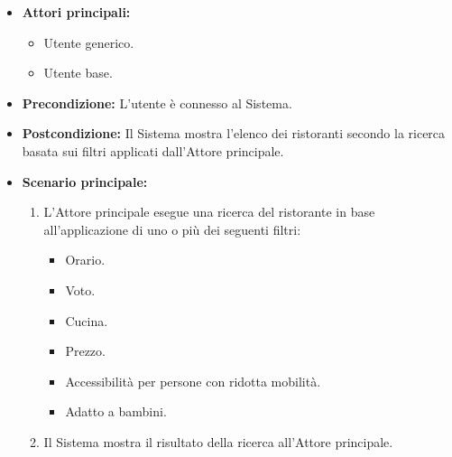 \label{usecase:Ricerca ristoranti per filtri}
\begin{itemize}
	\item \textbf{Attori principali:} 
	\begin{itemize}
		\item Utente generico.
		\item Utente base.
	\end{itemize}

	\item \textbf{Precondizione:} L'utente è connesso al Sistema.

	\item \textbf{Postcondizione:} Il Sistema mostra l'elenco dei ristoranti secondo la ricerca basata sui filtri applicati dall'Attore principale.

	\item \textbf{Scenario principale:}
	      \begin{enumerate}
		      \item L'Attore principale esegue una ricerca del ristorante in base all'applicazione di uno o più dei seguenti filtri:
		            \begin{itemize}
			            \item Orario.
			            \item Voto.
			            \item Cucina.
			            \item Prezzo.
			            \item Accessibilità per persone con ridotta mobilità.
			            \item Adatto a bambini.
		            \end{itemize}
		      \item Il Sistema mostra il risultato della ricerca all'Attore principale.
	      \end{enumerate}
\end{itemize}
